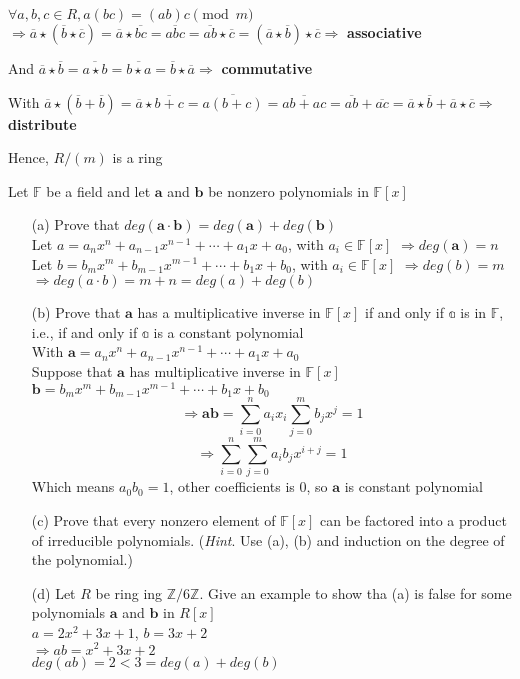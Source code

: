 \begin{exer}[2.33]
$\forall a, b, c \in R, a(bc)=(ab)c \pmod m$ \\ $\Rightarrow \overline{a} \star (\overline{b} \star \overline{c}) = \overline{a} \star \overline{bc} = \overline{abc} = \overline{ab} \star \overline{c} = (\overline{a} \star \overline{b}) \star \overline{c} \Rightarrow$ \textbf{associative}

And $\overline{a} \star \overline{b} = \overline{a \star b} = \overline{b \star a} = \overline{b} \star \overline{a} \Rightarrow$ \textbf{commutative}

With $\overline{a} \star (\overline{b} + \overline{b}) = \overline{a} \star \overline{b + c} = \overline{a(b+c)} = \overline{ab + ac} = \overline{ab} + \overline{ac} = \overline{a} \star \overline{b} + \overline{a} \star \overline{c} \Rightarrow$ \textbf{distribute}

Hence, $R/(m)$ is a ring
\end{exer}

\begin{exer}[2.34]
Let $\mathbb{F}$ be a field and let $\mathbf{a}$ and $\mathbf{b}$ be nonzero polynomials in $\mathbb{F}[x]$
\begin{enumerate}
    \item [(a)] Prove that $deg(\textbf{a} \cdot \textbf{b}) = deg(\textbf{a}) + deg(\textbf{b})$ \\ Let $a=a_n x^n + a_{n-1} x^{n-1} + \cdots + a_1 x + a_0$, with $a_i \in \mathbb{F}[x]$ $\Rightarrow deg(\mathbf{a}) = n$ \\ Let $b = b_m x^m + b_{m-1} x^{m-1} + \cdots + b_1 x + b_0$, with $a_i \in \mathbb{F}[x]$ $\Rightarrow deg(b) = m$ \\ $\Rightarrow deg(a \cdot b) = m+n = deg(a) + deg(b)$
    \item [(b)] Prove that $\mathbf{a}$ has a multiplicative inverse in $\mathbb{F}[x]$ if and only if $\mathbb{a}$ is in $\mathbb{F}$, i.e., if and only if $\mathbb{a}$ is a constant polynomial \\ With $\mathbf{a} = a_n x^n + a_{n-1} x^{n-1} + \cdots + a_1 x + a_0$ \\ Suppose that $\mathbf{a}$ has multiplicative inverse in $\mathbb{F}[x]$ $\mathbf{b}=b_m x^m + b_{m-1} x^{m-1} + \cdots + b_1 x + b_0$ \[\Rightarrow \mathbf{ab} = \sum_{i=0}^n a_i x_i \sum_{j=0}^m b_j x^j = 1\] \[\Rightarrow \sum_{i=0}^n \sum_{j=0}^m a_i b_j x^{i+j} = 1\] Which means $a_0 b_0 = 1$, other coefficients is 0, so $\mathbf{a}$ is constant polynomial
    \item [(c)] Prove that every nonzero element of $\mathbb{F}[x]$ can be factored into a product of irreducible polynomials. (\textit{Hint}. Use (a), (b) and induction on the degree of the polynomial.)
    \item [(d)] Let $R$ be ring ing $\mathbb{Z}/6\mathbb{Z}$. Give an example to show tha (a) is false for some polynomials $\mathbf{a}$ and $\mathbf{b}$ in $R[x]$ \\ $a=2x^2 + 3x + 1$, $b=3x+2$ \\ $\Rightarrow ab = x^2 + 3x + 2$ \\ $deg(ab) = 2 < 3 = deg(a) + deg(b)$
\end{enumerate}
\end{exer}

